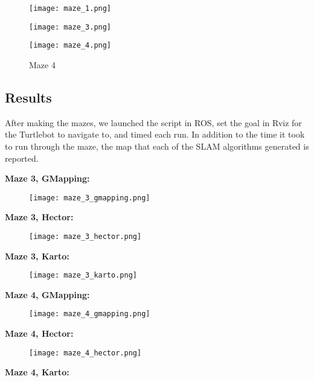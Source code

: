 \documentclass{article}
\begin{document}
\begin{figure}[htbp]
    \centering
    \begin{minipage}{0.3\textwidth}
        \centering
        \texttt{[image: maze\_1.png]} 
        \caption{Maze 1}
    \end{minipage}%
    \hfill
    \begin{minipage}{0.3\textwidth}
        \centering
        \texttt{[image: maze\_3.png]}
        \caption{Maze 3}
    \end{minipage}%
    \hfill
    \begin{minipage}{0.3\textwidth}
        \centering
        \texttt{[image: maze\_4.png]}
        \caption{Maze 4}
    \end{minipage}
\end{figure}

\subsection{Results}
After making the mazes, we launched the script in ROS, set the goal in Rviz for the Turtlebot to navigate to, and timed each run. 
In addition to the time it took to run through the maze, the map that each of the SLAM algorithms generated is reported. 

{\bf Maze 3, GMapping:}

\begin{figure}[htbp]
    \centering
    \texttt{[image: maze\_3\_gmapping.png]} 
\end{figure}
\pagebreak
{\bf Maze 3, Hector:}

\begin{figure}[htbp]
    \centering
    \texttt{[image: maze\_3\_hector.png]} 
\end{figure}

{\bf Maze 3, Karto:}

\begin{figure}[htbp]
    \centering
    \texttt{[image: maze\_3\_karto.png]} 
\end{figure}
\pagebreak
{\bf Maze 4, GMapping:}

\begin{figure}[htbp]
    \centering
    \texttt{[image: maze\_4\_gmapping.png]} 
\end{figure}
{\bf Maze 4, Hector:}

\begin{figure}[htbp]
    \centering
    \texttt{[image: maze\_4\_hector.png]} 
\end{figure}
\pagebreak
{\bf Maze 4, Karto:}
\end{document}
